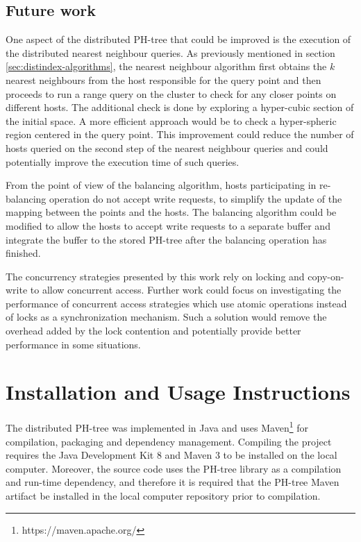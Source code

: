 \documentclass[11pt,a4paper]{globis-book}
\begin{document}
\section{Future work}
\label{sec:conclusions-future-work}

One aspect of the distributed PH-tree that could be improved is the execution of the distributed nearest neighbour queries. As previously mentioned in section \ref{sec:distindex-algorithms}, the nearest neighbour algorithm first obtains the $k$ nearest neighbours from the host responsible for the query point and then proceeds to run a range query on the cluster to check for any closer points on different hosts. The additional check is done by exploring a hyper-cubic section of the initial space. A more efficient approach would be to check a hyper-spheric region centered in the query point. This improvement could reduce the number of hosts queried on the second step of the nearest neighbour queries and could potentially improve the execution time of such queries. 

From the point of view of the balancing algorithm, hosts participating in re-balancing operation do not accept write requests, to simplify the update of the mapping between the points and the hosts. The balancing algorithm could be modified to allow the hosts to accept write requests to a separate buffer and integrate the buffer to the stored PH-tree after the balancing operation has finished.

The concurrency strategies presented by this work rely on locking and copy-on-write to allow concurrent access. Further work could focus on investigating the performance of concurrent access strategies which use atomic operations instead of locks as a synchronization mechanism. Such a solution would remove the overhead added by the lock contention and potentially provide better performance in some situations.

\appendix
\chapter{Installation and Usage Instructions}

The distributed PH-tree was implemented in Java and uses Maven\footnote{https://maven.apache.org/} for compilation, packaging and dependency management. Compiling the project requires the Java Development Kit 8 and Maven 3 to be installed on the local computer. Moreover, the source code uses the PH-tree library as a compilation and run-time dependency, and therefore it is required that the PH-tree Maven artifact be installed in the local computer repository prior to compilation. 
\end{document}
